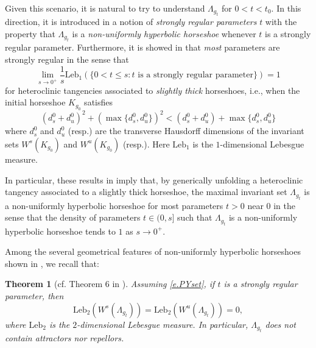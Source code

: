 \documentclass[12pt]{amsart}
\newtheorem{theorem}{Theorem}[section]
\numberwithin{equation}{section}
\theoremstyle{definition}
\newcommand{\<}{{\langle}}
\renewcommand{\>}{{\rangle}}
\begin{document}
Given this scenario, it is natural to try to understand $\Lambda_{g_t}$ for $0<t<t_0$. In this direction, 
it is introduced in \cite{PY09} a notion of \emph{strongly regular parameters} $t$ with the property that $\Lambda_{g_t}$ is a \emph{non-uniformly hyperbolic horseshoe} 
whenever $t$ is a strongly regular parameter. Furthermore, %
it is showed in \cite{PY09} that \emph{most} parameters are strongly regular in the sense that 
$$\lim\limits_{s\to0^+}\frac{1}{s}\textrm{Leb}_1(\{0<t\leq s: t \textrm{ is a strongly regular parameter}\})=1$$
for heteroclinic tangencies associated to \emph{slightly thick} horseshoes, i.e., when the initial horseshoe $K_{g_0}$ satisfies 
\begin{equation}\label{e.PYset}
(d_s^0+d_u^0)^2+(\max\{d_s^0, d_u^0\})^2< (d_s^0+d_u^0) + \max\{d_s^0, d_u^0\}
\end{equation} 
where $d_s^0$ and $d_u^0$ (resp.) are the transverse Hausdorff dimensions of the invariant sets $W^s(K_{g_0})$ and $W^u(K_{g_0})$ (resp.). Here $\textrm{Leb}_1$ is the $1$-dimensional Lebesgue measure.

In particular, these results %
in \cite{PY09} imply that, by generically unfolding a heteroclinic tangency associated to a slightly thick horseshoe, the maximal invariant set $\Lambda_{g_t}$ is a non-uniformly hyperbolic horseshoe for most parameters $t>0$ near $0$ in the sense that the density of parameters $t\in (0,s]$ such that $\Lambda_{g_t}$ is a non-uniformly hyperbolic horseshoe tends to $1$ as $s\to 0^+$. 


Among the several geometrical features of non-uniformly hyperbolic horseshoes shown in \cite{PY09}, we recall that:
\begin{theorem}[cf. Theorem 6 in \cite{PY09}]\label{t.PY09-Thm6} Assuming \eqref{e.PYset}, if $t$ is a strongly regular parameter, then 
$$\textrm{Leb}_2(W^s(\Lambda_{g_t}))=\textrm{Leb}_2(W^u(\Lambda_{g_t}))=0,$$
where $\textrm{Leb}_2$ is the $2$-dimensional Lebesgue measure. In particular, $\Lambda_{g_t}$ does not contain attractors nor repellors.
\end{theorem}
\end{document}
